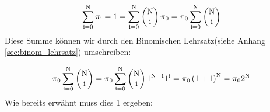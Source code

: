 {\begin{uebsp}
\begin{Answer}
\begin{equation*}
\sum
_{\normalsubformula{\text{i}}=\normalsubformula{\text{0}}}^{\normalsubformula{\text{N}}}\normalsubformula{\text{$\pi
$}}_{\normalsubformula{\text{i}}}=\normalsubformula{\text{1}}=\sum
_{\normalsubformula{\text{i}}=\normalsubformula{\text{0}}}^{\normalsubformula{\text{N}}}{\left(\begin{matrix}\normalsubformula{\text{N}}\\\normalsubformula{\text{i}}\end{matrix}\right)\normalsubformula{\text{$\pi
$}}_{\normalsubformula{\text{0}}}}=\normalsubformula{\text{$\pi
$}}_{\normalsubformula{\text{0}}}\sum
_{\normalsubformula{\text{i}}=\normalsubformula{\text{0}}}^{\normalsubformula{\text{N}}}\left(\begin{matrix}\normalsubformula{\text{N}}\\\normalsubformula{\text{i}}\end{matrix}\right)
\end{equation*}
Diese Summe k\"onnen wir durch den Binomischen Lehrsatz(siehe Anhang \ref{sec:binom_lehrsatz}) umschreiben:

\begin{equation*}
\normalsubformula{\text{$\pi $}}_{\normalsubformula{\text{0}}}\sum
_{\normalsubformula{\text{i}}=\normalsubformula{\text{0}}}^{\normalsubformula{\text{N}}}\left(\begin{matrix}\normalsubformula{\text{N}}\\\normalsubformula{\text{i}}\end{matrix}\right)=\normalsubformula{\text{$\pi
$}}_{\normalsubformula{\text{0}}}\sum
_{\normalsubformula{\text{i}}=\normalsubformula{\text{0}}}^{\normalsubformula{\text{N}}}{\left(\begin{matrix}\normalsubformula{\text{N}}\\\normalsubformula{\text{i}}\end{matrix}\right)\normalsubformula{\text{1}}^{\normalsubformula{\text{N}}-\normalsubformula{\text{1}}}\normalsubformula{\text{1}}^{\normalsubformula{\text{i}}}}=\normalsubformula{\text{$\pi
$}}_{\normalsubformula{\text{0}}}\left(\normalsubformula{\text{1}}+\normalsubformula{\text{1}}\right)^{\normalsubformula{\text{N}}}=\normalsubformula{\text{$\pi
$}}_{\normalsubformula{\text{0}}}\normalsubformula{\text{2}}^{\normalsubformula{\text{N}}}
\end{equation*}
{
Wie bereits erw\"ahnt muss dies 1 ergeben:}


\end{Answer}
\end{uebsp}}
